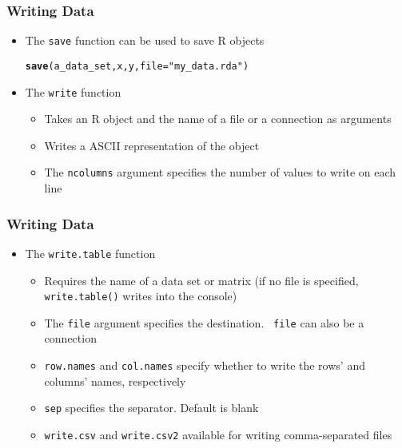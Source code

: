 \documentclass[paper=screen,mathserif]{beamer}\usepackage[]{graphicx}\usepackage[]{color}
\makeatletter
\newcommand{\hlstr}[1]{\textcolor[rgb]{0.192,0.494,0.8}{#1}}%
\newcommand{\hlstd}[1]{\textcolor[rgb]{0.345,0.345,0.345}{#1}}%
\newcommand{\hlkwc}[1]{\textcolor[rgb]{0.333,0.667,0.333}{#1}}%
\newcommand{\hlkwd}[1]{\textcolor[rgb]{0.737,0.353,0.396}{\textbf{#1}}}%
\newenvironment{kframe}{%
 \def\at@end@of@kframe{}%
 \ifinner\ifhmode%
  \def\at@end@of@kframe{\end{minipage}}%
  \begin{minipage}{\columnwidth}%
 \fi\fi%
 \def\FrameCommand##1{\hskip\@totalleftmargin \hskip-\fboxsep
 \colorbox{shadecolor}{##1}\hskip-\fboxsep
     \hskip-\linewidth \hskip-\@totalleftmargin \hskip\columnwidth}%
 \MakeFramed {\advance\hsize-\width
   \@totalleftmargin\z@ \linewidth\hsize
   \@setminipage}}%
 {\par\unskip\endMakeFramed%
 \at@end@of@kframe}
\newenvironment{knitrout}{}{} %
\newcommand{\ft}[1]{\frametitle{#1}}
\makeatother
\begin{document}
\begin{frame}[fragile]
  \ft{Writing Data}
  \begin{itemize}\setlength\parskip{10pt}
  \item The {\tt save} function can be used to save R objects
\begin{knitrout}\scriptsize
{}\color{fgcolor}\begin{kframe}
\begin{alltt}
\hlkwd{save}\hlstd{(a_data_set, x, y,} \hlkwc{file} \hlstd{=} \hlstr{"my_data.rda"}\hlstd{)}
\end{alltt}
\end{kframe}
\end{knitrout}
  \item The {\tt write} function
    \begin{itemize}
    \item Takes an R object and the name of a file or a connection as arguments
    \item Writes a ASCII representation of the object
    \item The {\tt ncolumns} argument specifies the number of values
      to write on each line
    \end{itemize}
  \end{itemize}
\end{frame}

\begin{frame}[fragile]
  \ft{Writing Data}
  \begin{itemize}
  \item The {\tt write.table} function
    \begin{itemize}
    \item Requires the name of a data set or matrix (if no file is
      specified, {\tt write.table()} writes into the console)
    \item The {\tt file} argument specifies the destination. {\tt
        file} can also be a connection
    \item {\tt row.names} and {\tt col.names} specify whether to write
      the rows' and columns' names, respectively
    \item {\tt sep} specifies the separator. Default is blank 
    \item {\tt write.csv} and {\tt write.csv2} available for writing
      comma-separated files
    \end{itemize}
  \end{itemize}
\end{frame}
\end{document}
